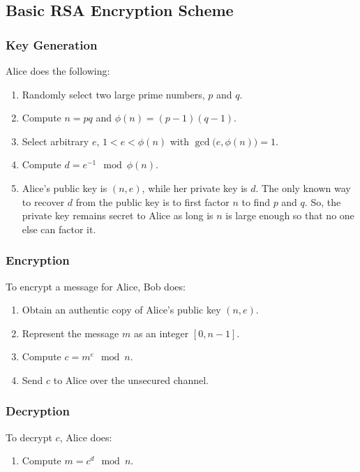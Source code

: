 \subsection*{Basic RSA Encryption Scheme}
\subsubsection*{Key Generation}
Alice does the following:
\begin{enumerate}
    \item Randomly select two large prime numbers, $ p $ and $ q $.
    \item Compute $ n=pq $ and $ \phi(n)=(p-1)(q-1) $.
    \item Select arbitrary $ e $, $ 1<e<\phi(n) $ with $ \gcd\bigl(e,\phi(n)\bigr)=1 $.
    \item Compute $ d= e^{-1}\mod \phi(n) $.
    \item Alice's public key is $ (n,e) $, while her private key is $ d $.
          The only known way to recover $ d $ from the public key is to first factor
          $ n $ to find $ p $ and $ q $. So, the private key remains secret
          to Alice as long is $ n $ is large enough so that no one else can factor it.
\end{enumerate}
\subsubsection*{Encryption}
To encrypt a message for Alice, Bob does:
\begin{enumerate}
    \item Obtain an authentic copy of Alice's public key $ (n,e) $.
    \item Represent the message $ m $ as an integer $ [0,n-1] $.
    \item Compute $ c= m^e \mod n $.
    \item Send $ c $ to Alice over the unsecured channel.
\end{enumerate}
\subsubsection*{Decryption}
To decrypt $ c $, Alice does:
\begin{enumerate}
    \item Compute $ m= c^d\mod n $.
\end{enumerate}

